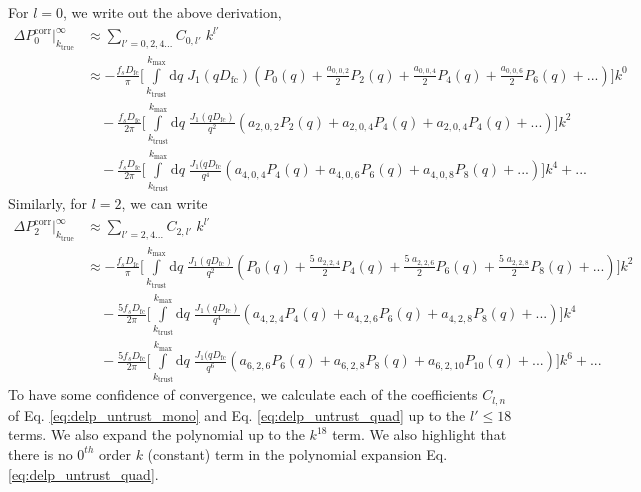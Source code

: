 For $l=0$, we write out the above derivation, 
\begin{align} \label{eq:delp_untrust_mono}
\Delta P^\mathrm{corr}_0 \bigg|_{k_\mathrm{true}}^\infty &\approx \sum\limits_{l' = 0, 2, 4 ... } C_{0,l'}\;k^{l'} \nonumber \\
&\approx 
-\frac{f_s D_\mathrm{fc}}{\pi} \bigg[
\int\limits_{k_\mathrm{trust}}^{k_\mathrm{max}} \mathrm{d}q\;
J_1(q D_\mathrm{fc}) \left( P_0(q) + \frac{a_{0,0,2}}{2} P_2(q) + \frac{a_{0,0,4}}{2} P_4(q) + \frac{a_{0,0,6}}{2} P_6(q) + ... \right)
\bigg]k^0  \nonumber \\
&\quad
-\frac{f_s D_\mathrm{fc}}{2 \pi} \bigg[
\int\limits_{k_\mathrm{trust}}^{k_\mathrm{max}} \mathrm{d}q\;\frac{J_1(q D_\mathrm{fc})}{q^2} \left( 
a_{2,0,2} P_2(q) + a_{2,0,4} P_4(q) + a_{2,0,4} P_4(q) + ...
\right)
\bigg] k^2  \nonumber \\
& \quad
-\frac{f_s D_\mathrm{fc}}{2 \pi} \bigg[
\int\limits_{k_\mathrm{trust}}^{k_\mathrm{max}} \mathrm{d}q\;\frac{J_1(q D_\mathrm{fc}}{q^4} \left( 
a_{4,0,4} P_4(q) + a_{4,0,6} P_6(q) + a_{4,0,8} P_8(q) + ...
\right)
\bigg] k^4 + ...
\end{align}
Similarly, for $l = 2$, we can write
\begin{align} \label{eq:delp_untrust_quad}
\Delta P^\mathrm{corr}_2 \bigg|_{k_\mathrm{true}}^\infty &\approx \sum\limits_{l' = 2, 4 ... } C_{2,l'}\;k^{l'} \nonumber \\
&\approx 
-\frac{f_s D_\mathrm{fc}}{\pi} \bigg[
\int\limits_{k_\mathrm{trust}}^{k_\mathrm{max}} \mathrm{d}q\;
\frac{J_1(q D_\mathrm{fc})}{q^2} \left( P_0(q) + \frac{5\;a_{2,2,4}}{2} P_4(q) + \frac{5\;a_{2,2,6}}{2} P_6(q) + \frac{5\;a_{2,2,8}}{2} P_8(q) + ... \right)
\bigg] k^2  \nonumber \\
&\quad
-\frac{5f_s D_\mathrm{fc}}{2 \pi} \bigg[
\int\limits_{k_\mathrm{trust}}^{k_\mathrm{max}} \mathrm{d}q\;\frac{J_1(q D_\mathrm{fc})}{q^4} \left( 
a_{4,2,4} P_4(q) + a_{4,2,6} P_6(q) + a_{4,2,8} P_8(q) + ...
\right)
\bigg] k^4 \nonumber \\
& \quad
-\frac{5f_s D_\mathrm{fc}}{2 \pi} \bigg[
\int\limits_{k_\mathrm{trust}}^{k_\mathrm{max}} \mathrm{d}q\;\frac{J_1(q D_\mathrm{fc}}{q^6} \left( 
a_{6,2,6} P_6(q) + a_{6,2,8} P_8(q) + a_{6,2,10} P_{10}(q) + ...
\right)
\bigg] k^6+ ...
\end{align}
To have some confidence of convergence, we calculate each of the coefficients 
$C_{l, n}$ of Eq. \ref{eq:delp_untrust_mono} and Eq. \ref{eq:delp_untrust_quad} 
up to the $l' \leq 18$ terms. We also expand the polynomial up to the $k^{18}$ term. 
We also highlight that there is no $0^{th}$ order $k$ (constant) term in the polynomial 
expansion Eq. \ref{eq:delp_untrust_quad}.


